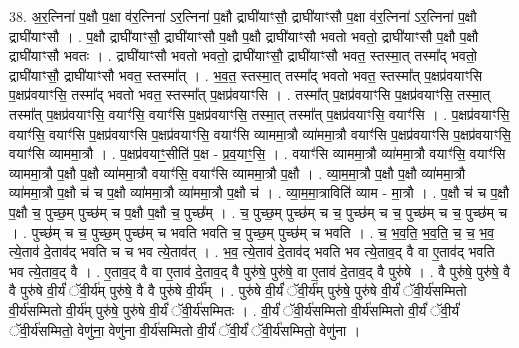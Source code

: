 \documentclass[17pt]{extarticle}
\begin{document}
38. अ॒र॒त्निना॑ प॒क्षौ प॒क्षा व॑र॒त्निना॑ ऽर॒त्निना॑ प॒क्षौ द्राघी॑याꣳसौ॒ द्राघी॑याꣳसौ प॒क्षा व॑र॒त्निना॑ ऽर॒त्निना॑ प॒क्षौ द्राघी॑याꣳसौ । . प॒क्षौ द्राघी॑याꣳसौ॒ द्राघी॑याꣳसौ प॒क्षौ प॒क्षौ द्राघी॑याꣳसौ भवतो भवतो॒ द्राघी॑याꣳसौ प॒क्षौ प॒क्षौ द्राघी॑याꣳसौ भवतः । . द्राघी॑याꣳसौ भवतो भवतो॒ द्राघी॑याꣳसौ॒ द्राघी॑याꣳसौ भवत॒ स्तस्मा॒त् तस्मा᳚द् भवतो॒ द्राघी॑याꣳसौ॒ द्राघी॑याꣳसौ भवत॒ स्तस्मा᳚त् । . भ॒व॒त॒ स्तस्मा॒त् तस्मा᳚द् भवतो भवत॒ स्तस्मा᳚त् प॒क्षप्र॑वयाꣳसि प॒क्षप्र॑वयाꣳसि॒ तस्मा᳚द् भवतो भवत॒ स्तस्मा᳚त् प॒क्षप्र॑वयाꣳसि । . तस्मा᳚त् प॒क्षप्र॑वयाꣳसि प॒क्षप्र॑वयाꣳसि॒ तस्मा॒त् तस्मा᳚त् प॒क्षप्र॑वयाꣳसि॒ वयाꣳ॑सि॒ वयाꣳ॑सि प॒क्षप्र॑वयाꣳसि॒ तस्मा॒त् तस्मा᳚त् प॒क्षप्र॑वयाꣳसि॒ वयाꣳ॑सि । . प॒क्षप्र॑वयाꣳसि॒ वयाꣳ॑सि॒ वयाꣳ॑सि प॒क्षप्र॑वयाꣳसि प॒क्षप्र॑वयाꣳसि॒ वयाꣳ॑सि व्याममा॒त्रौ व्या॑ममा॒त्रौ वयाꣳ॑सि प॒क्षप्र॑वयाꣳसि प॒क्षप्र॑वयाꣳसि॒ वयाꣳ॑सि व्याममा॒त्रौ । . प॒क्षप्र॑वयाꣳ॒॒सीति॑ प॒क्ष - प्र॒व॒याꣳ॒॒सि॒ । . वयाꣳ॑सि व्याममा॒त्रौ व्या॑ममा॒त्रौ वयाꣳ॑सि॒ वयाꣳ॑सि व्याममा॒त्रौ प॒क्षौ प॒क्षौ व्या॑ममा॒त्रौ वयाꣳ॑सि॒ वयाꣳ॑सि व्याममा॒त्रौ प॒क्षौ । . व्या॒म॒मा॒त्रौ प॒क्षौ प॒क्षौ व्या॑ममा॒त्रौ व्या॑ममा॒त्रौ प॒क्षौ च॑ च प॒क्षौ व्या॑ममा॒त्रौ व्या॑ममा॒त्रौ प॒क्षौ च॑ । . व्या॒म॒मा॒त्राविति॑ व्याम - मा॒त्रौ । . प॒क्षौ च॑ च प॒क्षौ प॒क्षौ च॒ पुच्छ॒म् पुच्छ॑म् च प॒क्षौ प॒क्षौ च॒ पुच्छ᳚म् । . च॒ पुच्छ॒म् पुच्छ॑म् च च॒ पुच्छ॑म् च च॒ पुच्छ॑म् च च॒ पुच्छ॑म् च । . पुच्छ॑म् च च॒ पुच्छ॒म् पुच्छ॑म् च भवति भवति च॒ पुच्छ॒म् पुच्छ॑म् च भवति । . च॒ भ॒व॒ति॒ भ॒व॒ति॒ च॒ च॒ भ॒व॒ त्ये॒ताव॑ दे॒ताव॑द् भवति च च भव त्ये॒ताव॑त् । . भ॒व॒ त्ये॒ताव॑ दे॒ताव॑द् भवति भव त्ये॒ताव॒द् वै वा ए॒ताव॑द् भवति भव त्ये॒ताव॒द् वै । . ए॒ताव॒द् वै वा ए॒ताव॑ दे॒ताव॒द् वै पुरु॑षे॒ पुरु॑षे॒ वा ए॒ताव॑ दे॒ताव॒द् वै पुरु॑षे । . वै पुरु॑षे॒ पुरु॑षे॒ वै वै पुरु॑षे वी॒र्यं॑ ॅवी॒र्य॑म् पुरु॑षे॒ वै वै पुरु॑षे वी॒र्य᳚म् । . पुरु॑षे वी॒र्यं॑ ॅवी॒र्य॑म् पुरु॑षे॒ पुरु॑षे वी॒र्यं॑ ॅवी॒र्य॑सम्मितो वी॒र्य॑सम्मितो वी॒र्य॑म् पुरु॑षे॒ पुरु॑षे वी॒र्यं॑ ॅवी॒र्य॑सम्मितः । . वी॒र्यं॑ ॅवी॒र्य॑सम्मितो वी॒र्य॑सम्मितो वी॒र्यं॑ ॅवी॒र्यं॑ ॅवी॒र्य॑सम्मितो॒ वेणु॑ना॒ वेणु॑ना वी॒र्य॑सम्मितो वी॒र्यं॑ ॅवी॒र्यं॑ ॅवी॒र्य॑सम्मितो॒ वेणु॑ना । \newline
\pagebreak
{}
\end{document}

